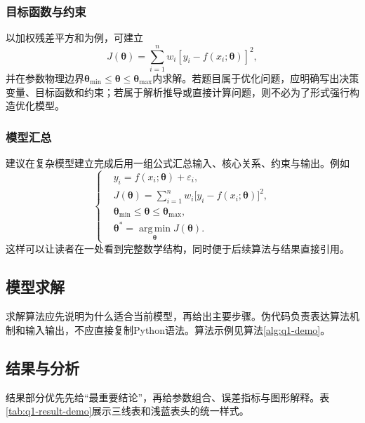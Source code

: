 \subsubsection{目标函数与约束}

以加权残差平方和为例，可建立
\begin{equation}
J(\boldsymbol\theta)
=\sum_{i=1}^{n}w_i\left[y_i-f(x_i;\boldsymbol\theta)\right]^2,
\label{eq:q1-objective-demo}
\end{equation}
并在参数物理边界$\boldsymbol\theta_{\min}\le\boldsymbol\theta\le\boldsymbol\theta_{\max}$内求解。若题目属于优化问题，应明确写出决策变量、目标函数和约束；若属于解析推导或直接计算问题，则不必为了形式强行构造优化模型。

\subsubsection{模型汇总}

建议在复杂模型建立完成后用一组公式汇总输入、核心关系、约束与输出。例如
\begin{equation}
\left\{
\begin{aligned}
&y_i=f(x_i;\boldsymbol\theta)+\varepsilon_i,\\
&J(\boldsymbol\theta)=\sum_{i=1}^{n}w_i\bigl[y_i-f(x_i;\boldsymbol\theta)\bigr]^2,\\
&\boldsymbol\theta_{\min}\le\boldsymbol\theta\le\boldsymbol\theta_{\max},\\
&\boldsymbol\theta^{*}=\operatorname*{arg\,min}_{\boldsymbol\theta}J(\boldsymbol\theta).
\end{aligned}
\right.
\label{eq:q1-summary-demo}
\end{equation}
这样可以让读者在一处看到完整数学结构，同时便于后续算法与结果直接引用。

\subsection{模型求解}

求解算法应先说明为什么适合当前模型，再给出主要步骤。伪代码负责表达算法机制和输入输出，不应直接复制Python语法。算法示例见算法\ref{alg:q1-demo}。



\subsection{结果与分析}

结果部分优先先给“最重要结论”，再给参数组合、误差指标与图形解释。表\ref{tab:q1-result-demo}展示三线表和浅蓝表头的统一样式。

